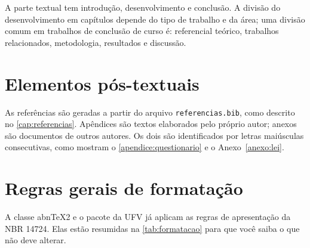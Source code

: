 A parte textual tem introdução, desenvolvimento e conclusão. A divisão do desenvolvimento em capítulos depende do tipo de trabalho e da área; uma divisão comum em trabalhos de conclusão de curso é: referencial teórico, trabalhos relacionados, metodologia, resultados e discussão.

\section{Elementos pós-textuais}\label{sec:pos-textuais}

As referências são geradas a partir do arquivo \texttt{referencias.bib}, como descrito no \autoref{cap:referencias}. Apêndices são textos elaborados pelo próprio autor; anexos são documentos de outros autores. Os dois são identificados por letras maiúsculas consecutivas, como mostram o \autoref{apendice:questionario} e o Anexo~\ref{anexo:lei}.

\section{Regras gerais de formatação}\label{sec:formatacao}

A classe abn\TeX2 e o pacote da UFV já aplicam as regras de apresentação da NBR 14724. Elas estão resumidas na \autoref{tab:formatacao} para que você saiba o que não deve alterar.

\begin{table}[htbp]
\end{table}

